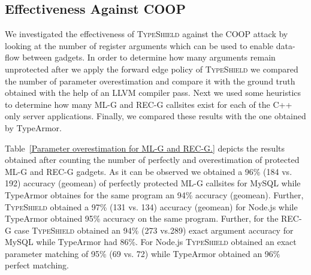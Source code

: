 \subsection{Effectiveness Against COOP}
\label{RQ8: Effectiveness Against COOP}
We investigated the effectiveness of \textsc{TypeShield} against the COOP
attack by looking at the number of register arguments which can be used to enable 
data-flow between gadgets. In order to determine how many arguments 
remain unprotected after we apply the forward edge policy of \textsc{TypeShield}
we compared the number of parameter overestimation and compare it with the ground truth
obtained with the help of an LLVM compiler pass. Next we used some heuristics to determine 
how many ML-G and REC-G callsites exist for each of the C++ only server applications.
Finally, we compared these results with the one obtained by TypeArmor.

\begin{table}[H]
\centering 
{}
\caption{Parameter overestimation for ML-G and REC-G.}
\label{Parameter overestimation for ML-G and REC-G.}

\vspace{-.5cm}
\end{table}
Table~\ref{Parameter overestimation for ML-G and REC-G.} depicts the results obtained
after counting the number of perfectly and overestimation of protected ML-G and 
REC-G gadgets. As it can be observed we obtained a
96\% (184 vs. 192) accuracy (geomean) of perfectly protected ML-G callsites for MySQL while
TypeArmor obtaines for the same program an 94\% accuracy (geomean). Further,
\textsc{TypeShield} obtained a 97\% (131 vs. 134) accuracy (geomean) for Node.js while TypeArmor
obtained 95\% accuracy on the same program.
Further, for the REC-G case \textsc{TypeShield} obtained an
94\% (273 vs.289) exact argument accuracy for MySQL while TypeArmor had 86\%.
For Node.js \textsc{TypeShield} obtained an exact parameter 
matching of 95\% (69 vs. 72) while TypeArmor obtained an 96\% perfect matching.

